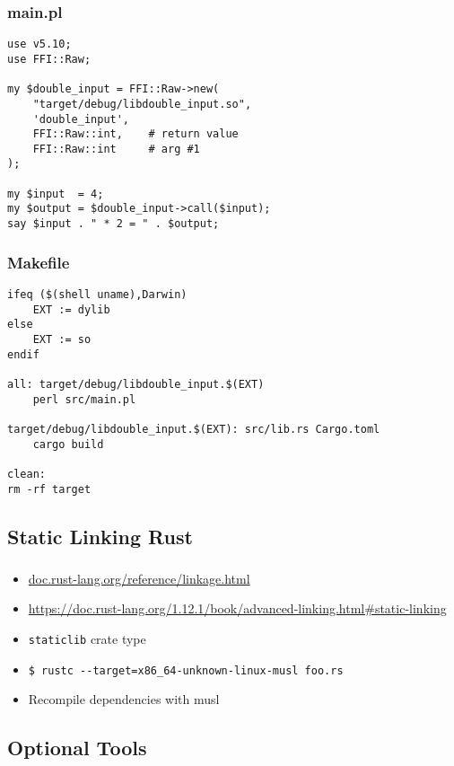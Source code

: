 \documentclass{beamer}
\begin{document}
\begin{frame}[fragile]
\frametitle{main.pl}
\begin{verbatim}
use v5.10;
use FFI::Raw;

my $double_input = FFI::Raw->new(
    "target/debug/libdouble_input.so",
    'double_input',
    FFI::Raw::int,    # return value
    FFI::Raw::int     # arg #1
);

my $input  = 4;
my $output = $double_input->call($input);
say $input . " * 2 = " . $output;
\end{verbatim}
\end{frame}

\begin{frame}[fragile]
\frametitle{Makefile}
\begin{verbatim}
ifeq ($(shell uname),Darwin)
    EXT := dylib
else
    EXT := so
endif

all: target/debug/libdouble_input.$(EXT)
    perl src/main.pl

target/debug/libdouble_input.$(EXT): src/lib.rs Cargo.toml
    cargo build

clean:
rm -rf target
\end{verbatim}
\end{frame}


\subsection{Static Linking Rust}

\begin{frame}[fragile]
\tableofcontents[currentsubsection]
\end{frame}


\begin{frame}[fragile]
\frametitle{\insertsubsectionhead}

\begin{itemize}[<+(1)->]
\item \url{doc.rust-lang.org/reference/linkage.html}
\item \url{https://doc.rust-lang.org/1.12.1/book/advanced-linking.html#static-linking}
\item \verb|staticlib| crate type
\item \verb|$ rustc --target=x86_64-unknown-linux-musl foo.rs|
\item Recompile dependencies with musl
\end{itemize}

\end{frame}

\subsection{Optional Tools}
\end{document}
